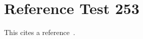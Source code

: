 \documentclass{article}
\begin{document}
\section{Reference Test 253}
This cites a reference~\cite{test253}.

\end{document}
